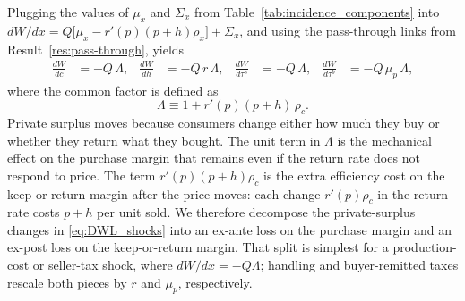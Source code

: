 \documentclass[11pt]{article}
\begin{document}
Plugging the values of $\mu_x$ and $\Sigma_x$ from
Table~\ref{tab:incidence_components} into
$dW/dx=Q\bigl[\mu_x-r'(p)(p+h)\rho_x\bigr]+\Sigma_x$, and using the
pass-through links from Result~\ref{res:pass-through}, yields
\begin{align}
  \frac{dW}{dc}
  &= -Q\,\Lambda,
  &
  \frac{dW}{dh}
  &= -Q\,r\,\Lambda,
  &
  \frac{dW}{d\tau^s}
  &= -Q\,\Lambda,
  &
  \frac{dW}{d\tau^b}
  &= -Q\,\mu_p\,\Lambda,
  \label{eq:DWL_shocks}
\end{align}
where the common factor is defined as
\begin{equation}
  \Lambda \equiv 1 + r'(p)(p+h)\,\rho_c.
  \label{eq:Lambda}
\end{equation}
Private surplus moves because consumers change either how much they buy or
whether they return what they bought.  The unit term in $\Lambda$ is the
mechanical effect on the purchase margin that remains even if the return rate
does not respond to price.  The term $r'(p)(p+h)\rho_c$ is the extra
efficiency cost on the keep-or-return margin after the price moves: each
change $r'(p)\rho_c$ in the return rate costs $p+h$ per unit sold.  We
therefore decompose the private-surplus changes in \eqref{eq:DWL_shocks} into
an ex-ante loss on the purchase margin and an ex-post loss on the
keep-or-return margin.  That split is simplest for a production-cost or
seller-tax shock, where $dW/dx=-Q\Lambda$; handling and buyer-remitted taxes
rescale both pieces by $r$ and $\mu_p$, respectively.
\end{document}
